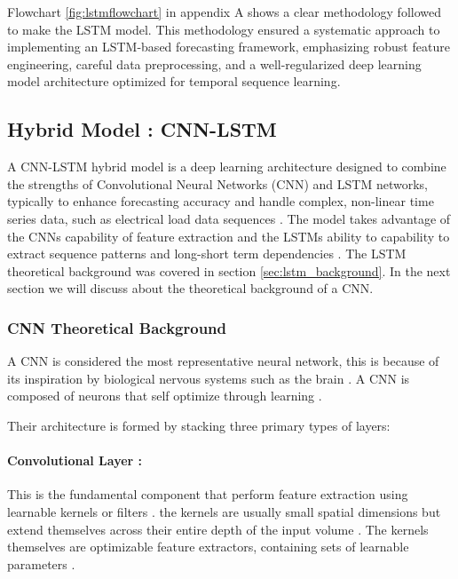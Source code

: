 Flowchart \ref{fig:lstmflowchart} in appendix A shows a clear methodology followed to make the LSTM model. This methodology ensured a systematic approach to implementing an LSTM-based forecasting framework, emphasizing robust feature engineering, careful data preprocessing, and a well-regularized deep learning model architecture optimized for temporal sequence learning.


\subsection{Hybrid Model : CNN-LSTM }
A CNN-LSTM hybrid model is a deep learning architecture designed to combine the strengths of Convolutional Neural Networks (CNN) and LSTM networks, typically to enhance forecasting accuracy and handle complex, non-linear time series data, such as electrical load data sequences \cite{zhu2025novel}. The model takes advantage of the CNNs capability of feature extraction and the LSTMs ability to capability to extract sequence patterns and long-short term dependencies \cite{alhussein2020hybrid}. The LSTM theoretical background was covered in section \ref{sec:lstm_background}. In the next section we will discuss about the theoretical background of a CNN.

\subsubsection{CNN Theoretical Background}

A CNN is considered the most representative neural network, this is because of its inspiration by biological nervous systems such as the brain \cite{o2015introduction}. A CNN is composed of neurons that self optimize through learning \cite{o2015introduction}.

Their architecture is formed by stacking three primary types of layers:

\paragraph{Convolutional Layer :} This is the fundamental component that perform feature extraction using learnable kernels or filters \cite{yamashita2018convolutional}. the kernels are usually small spatial dimensions but extend themselves across their entire depth of the input volume \cite{ajit2020review}. The kernels themselves are optimizable feature extractors, containing sets of learnable parameters \cite{yamashita2018convolutional}.

